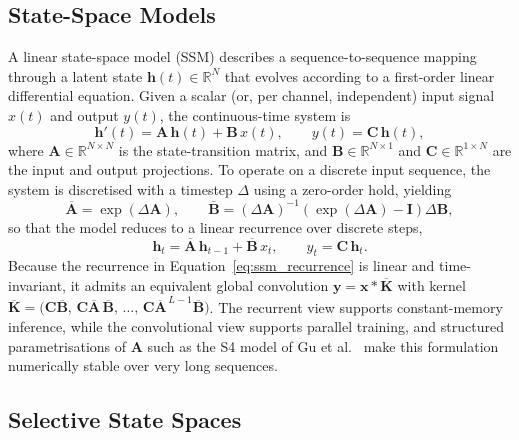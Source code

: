 \documentclass[%
    BCOR=10mm,
    DIV=13,
    toc=bibliography,
    toc=listof,
    oneside,
    12pt,
]{scrbook}
\begin{document}
\subsection{State-Space Models}
\label{subsec:ssm}

A linear state-space model (SSM) describes a sequence-to-sequence mapping
through a latent state $\mathbf{h}(t) \in \mathbb{R}^{N}$ that evolves
according to a first-order linear differential equation. Given a scalar (or,
per channel, independent) input signal $x(t)$ and output $y(t)$, the
continuous-time system is
\begin{equation}
  \mathbf{h}'(t) = \mathbf{A}\,\mathbf{h}(t) + \mathbf{B}\,x(t),
  \qquad
  y(t) = \mathbf{C}\,\mathbf{h}(t),
  \label{eq:ssm_continuous}
\end{equation}
where $\mathbf{A} \in \mathbb{R}^{N \times N}$ is the state-transition matrix,
and $\mathbf{B} \in \mathbb{R}^{N \times 1}$ and
$\mathbf{C} \in \mathbb{R}^{1 \times N}$ are the input and output projections.
To operate on a discrete input sequence, the system is discretised
with a timestep $\Delta$ using a zero-order hold, yielding
\begin{equation}
  \overline{\mathbf{A}} = \exp(\Delta \mathbf{A}),
  \qquad
  \overline{\mathbf{B}} = (\Delta \mathbf{A})^{-1}\!\left( \exp(\Delta \mathbf{A}) - \mathbf{I} \right) \Delta \mathbf{B},
  \label{eq:ssm_discretise}
\end{equation}
so that the model reduces to a linear recurrence over discrete steps,
\begin{equation}
  \mathbf{h}_t = \overline{\mathbf{A}}\,\mathbf{h}_{t-1} + \overline{\mathbf{B}}\,x_t,
  \qquad
  y_t = \mathbf{C}\,\mathbf{h}_t.
  \label{eq:ssm_recurrence}
\end{equation}
Because the recurrence in Equation~\ref{eq:ssm_recurrence} is linear and
time-invariant, it admits an equivalent global convolution
$\mathbf{y} = \mathbf{x} * \overline{\mathbf{K}}$ with kernel
$\overline{\mathbf{K}} = \bigl( \mathbf{C}\overline{\mathbf{B}},\,
\mathbf{C}\overline{\mathbf{A}}\,\overline{\mathbf{B}},\, \ldots,\,
\mathbf{C}\overline{\mathbf{A}}^{\,L-1}\overline{\mathbf{B}} \bigr)$. The
recurrent view supports constant-memory inference, while the convolutional
view supports parallel training, and structured parametrisations of
$\mathbf{A}$ such as the S4 model of Gu et al.~\cite{gu2022s4} make this
formulation numerically stable over very long sequences.

\subsection{Selective State Spaces}
\label{subsec:selective_ssm}
\end{document}
